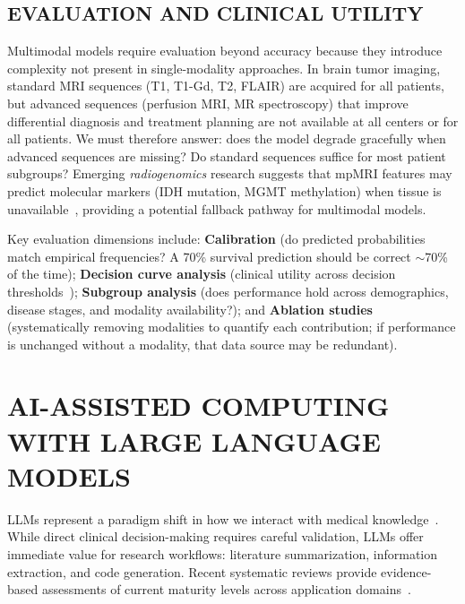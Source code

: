 \documentclass[krantz2,ChapterTOCs]{krantz}
\begin{document}
\subsection{EVALUATION AND CLINICAL UTILITY}

Multimodal models require evaluation beyond accuracy because they introduce complexity not present in single-modality approaches.
In brain tumor imaging, standard MRI sequences (T1, T1-Gd, T2, FLAIR) are acquired for all patients, but advanced sequences (perfusion MRI, MR spectroscopy) that improve differential diagnosis and treatment planning are not available at all centers or for all patients.
We must therefore answer: does the model degrade gracefully when advanced sequences are missing? Do standard sequences suffice for most patient subgroups?
Emerging \emph{radiogenomics} research suggests that mpMRI features may predict molecular markers (IDH mutation, MGMT methylation) when tissue is unavailable~\citep{sanchez2024radiogenomics, astaraki2026radiogenomics}, providing a potential fallback pathway for multimodal models.

Key evaluation dimensions include: \textbf{Calibration} (do predicted probabilities match empirical frequencies? A 70\% survival prediction should be correct $\sim$70\% of the time); \textbf{Decision curve analysis} (clinical utility across decision thresholds~\citep{vickers2006decision}); \textbf{Subgroup analysis} (does performance hold across demographics, disease stages, and modality availability?); and \textbf{Ablation studies} (systematically removing modalities to quantify each contribution; if performance is unchanged without a modality, that data source may be redundant).

\section{AI-ASSISTED COMPUTING WITH LARGE LANGUAGE MODELS}
\label{sec:llm}

LLMs represent a paradigm shift in how we interact with medical knowledge~\citep{brown2020language, singhal2023large}. 
While direct clinical decision-making requires careful validation, LLMs offer immediate value for research workflows: literature summarization, information extraction, and code generation.
Recent systematic reviews provide evidence-based assessments of current maturity levels across application domains~\citep{artsi2025llmclinical}.
\end{document}
